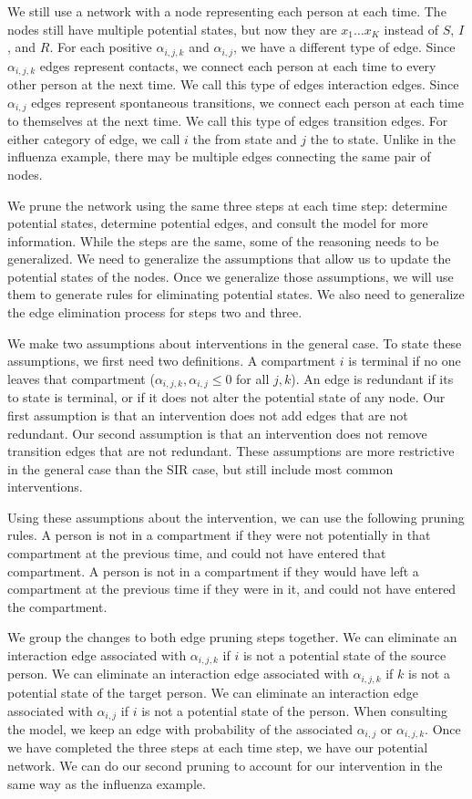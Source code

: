 \documentclass[PTRSB]{rsos}
\begin{document}
We still use a network with a node representing each person at each time.
The nodes still have multiple potential states, but now they are $x_1 \dots x_K$ instead of $S$, $I$, and $R$.
For each positive $\alpha_{i,j,k} $ and $\alpha_{i,j}$, we have a different type of edge.
Since $\alpha_{i,j,k}$ edges represent contacts, we connect each person at each time to every other person at the next time.
We call this type of edges interaction edges.
Since $\alpha_{i,j}$ edges represent spontaneous transitions, we connect each person at each time to themselves at the next time.
We call this type of edges transition edges.
For either category of edge, we call $i$ the from state and $j$ the to state.
Unlike in the influenza example, there may be multiple edges connecting the same pair of nodes.

We prune the network using the same three steps at each time step: determine potential states, determine potential edges, and consult the model for more information.
While the steps are the same, some of the reasoning needs to be generalized.
We need to generalize the assumptions that allow us to update the potential states of the nodes.
Once we generalize those assumptions, we will use them to generate rules for eliminating potential states.
We also need to generalize the edge elimination process for steps two and three.

We make two assumptions about interventions in the general case.
To state these assumptions, we first need two definitions.
A compartment $i$ is terminal if no one leaves that compartment ($\alpha_{i,j,k},\alpha_{i,j} \leq 0$ for all $j,k$).
An edge is redundant if its to state is terminal, or if it does not alter the potential state of any node.
Our first assumption is that an intervention does not add edges that are not redundant.
Our second assumption is that an intervention does not remove transition edges that are not redundant.
These assumptions are more restrictive in the general case than the SIR case, but still include most common interventions.

Using these assumptions about the intervention, we can use the following pruning rules.
A person is not in a compartment if they were not potentially in that compartment at the previous time, and could not have entered that compartment.
A person is not in a compartment if they would have left a compartment at the previous time if they were in it, and could not have entered the compartment.

We group the changes to both edge pruning steps together.
We can eliminate an interaction edge associated with $\alpha_{i,j,k}$ if $i$ is not a potential state of the source person.
We can eliminate an interaction edge associated with $\alpha_{i,j,k}$ if $k$ is not a potential state of the target person.
We can eliminate an interaction edge associated with $\alpha_{i,j}$ if $i$ is not a potential state of the person.
When consulting the model, we keep an edge with probability of the associated $\alpha_{i,j}$ or $\alpha_{i,j,k}$.
Once we have completed the three steps at each time step, we have our potential network.
We can do our second pruning to account for our intervention in the same way as the influenza example.
\end{document}
